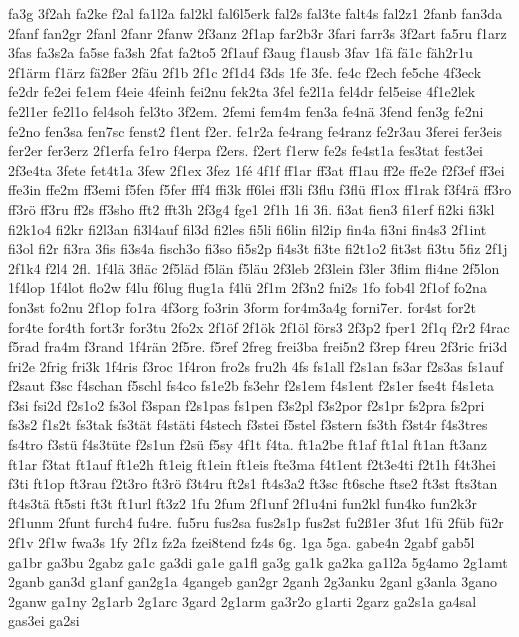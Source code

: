 {fa3g
3f2ah
fa2ke
f2al
fa1l2a
fal2kl
fal6l5erk
fal2s
fal3te
falt4s
fal2z1
2fanb
fan3da
2fanf
fan2gr
2fanl
2fanr
2fanw
2f3anz
2f1ap
far2b3r
3fari
farr3s
3f2art
fa5ru
f1arz
3fas
fa3s2a
fa5se
fa3sh
2fat
fa2to5
2f1auf
f3aug
f1ausb
3fav
1fä
fä1c
fäh2r1u
2f1ärm
f1ärz
fä2ßer
2fäu
2f1b
2f1c
2f1d4
f3ds
1fe
3fe.
fe4c
f2ech
fe5che
4f3eck
fe2dr
fe2ei
fe1em
f4eie
4feinh
fei2nu
fek2ta
3fel
fe2l1a
fel4dr
fel5eise
4f1e2lek
fe2l1er
fe2l1o
fel4soh
fel3to
3f2em.
2femi
fem4m
fen3a
fe4nä
3fend
fen3g
fe2ni
fe2no
fen3sa
fen7sc
fenst2
f1ent
f2er.
fe1r2a
fe4rang
fe4ranz
fe2r3au
3ferei
fer3eis
fer2er
fer3erz
2f1erfa
fe1ro
f4erpa
f2ers.
f2ert
f1erw
fe2s
fe4st1a
fes3tat
fest3ei
2f3e4ta
3fete
fet4t1a
3few
2f1ex
3fez
1fé
4f1f
ff1ar
ff3at
ff1au
ff2e
ffe2e
f2f3ef
ff3ei
ffe3in
ffe2m
ff3emi
f5fen
f5fer
fff4
ffi3k
ff6lei
ff3li
f3flu
f3flü
ff1ox
ff1rak
f3f4rä
ff3ro
ff3rö
ff3ru
ff2s
ff3sho
fft2
fft3h
2f3g4
fge1
2f1h
1fi
3fi.
fi3at
fien3
fi1erf
fi2ki
fi3kl
fi2k1o4
fi2kr
fi2l3an
fi3l4auf
fil3d
fi2les
fi5li
fi6lin
fil2ip
fin4a
fi3ni
fin4s3
2f1int
fi3ol
fi2r
fi3ra
3fis
fi3s4a
fisch3o
fi3so
fi5s2p
fi4s3t
fi3te
fi2t1o2
fit3st
fi3tu
5fiz
2f1j
2f1k4
f2l4
2fl.
1f4lä
3fläc
2f5läd
f5län
f5läu
2f3leb
2f3lein
f3ler
3flim
fli4ne
2f5lon
1f4lop
1f4lot
flo2w
f4lu
f6lug
flug1a
f4lü
2f1m
2f3n2
fni2s
1fo
fob4l
2f1of
fo2na
fon3st
fo2nu
2f1op
fo1ra
4f3org
fo3rin
3form
for4m3a4g
forni7er.
for4st
for2t
for4te
for4th
fort3r
for3tu
2fo2x
2f1öf
2f1ök
2f1öl
förs3
2f3p2
fper1
2f1q
f2r2
f4rac
f5rad
fra4m
f3rand
1f4rän
2f5re.
f5ref
2freg
frei3ba
frei5n2
f3rep
f4reu
2f3ric
fri3d
fri2e
2frig
fri3k
1f4ris
f3roc
1f4ron
fro2s
fru2h
4fs
fs1all
f2s1an
fs3ar
f2s3as
fs1auf
f2saut
f3sc
f4schan
f5schl
fs4co
fs1e2b
fs3ehr
f2s1em
f4s1ent
f2s1er
fse4t
f4s1eta
f3si
fsi2d
f2s1o2
fs3ol
f3span
f2s1pas
fs1pen
f3s2pl
f3s2por
f2s1pr
fs2pra
fs2pri
fs3s2
f1s2t
fs3tak
fs3tät
f4stäti
f4stech
f3stei
f5stel
f3stern
fs3th
f3st4r
f4s3tres
fs4tro
f3stü
f4s3tüte
f2s1un
f2sü
f5sy
4f1t
f4ta.
ft1a2be
ft1af
ft1al
ft1an
ft3anz
ft1ar
f3tat
ft1auf
ft1e2h
ft1eig
ft1ein
ft1eis
fte3ma
f4t1ent
f2t3e4ti
f2t1h
f4t3hei
f3ti
ft1op
ft3rau
f2t3ro
ft3rö
f3t4ru
ft2s1
ft4s3a2
ft3sc
ft6sche
ftse2
ft3st
fts3tan
ft4s3tä
ft5sti
ft3t
ft1url
ft3z2
1fu
2fum
2f1unf
2f1u4ni
fun2kl
fun4ko
fun2k3r
2f1unm
2funt
furch4
fu4re.
fu5ru
fus2sa
fus2s1p
fus2st
fu2ß1er
3fut
1fü
2füb
fü2r
2f1v
2f1w
fwa3s
1fy
2f1z
fz2a
fzei8tend
fz4s
6g.
1ga
5ga.
gabe4n
2gabf
gab5l
ga1br
ga3bu
2gabz
ga1c
ga3di
ga1e
ga1fl
ga3g
ga1k
ga2ka
ga1l2a
5g4amo
2g1amt
2ganb
gan3d
g1anf
gan2g1a
4gangeb
gan2gr
2ganh
2g3anku
2ganl
g3anla
3gano
2ganw
ga1ny
2g1arb
2g1arc
3gard
2g1arm
ga3r2o
g1arti
2garz
ga2s1a
ga4sal
gas3ei
ga2si
}
